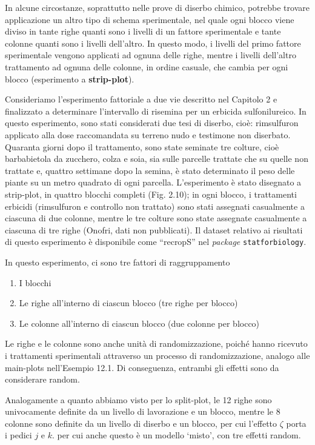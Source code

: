 \documentclass[
  12pt,
]{book}
\providecommand{\tightlist}{%
  \setlength{\itemsep}{0pt}\setlength{\parskip}{0pt}}
\begin{document}
In alcune circostanze, soprattutto nelle prove di diserbo chimico, potrebbe trovare applicazione un altro tipo di schema sperimentale, nel quale ogni blocco viene diviso in tante righe quanti sono i livelli di un fattore sperimentale e tante colonne quanti sono i livelli dell'altro. In questo modo, i livelli del primo fattore sperimentale vengono applicati ad ognuna delle righe, mentre i livelli dell'altro trattamento ad ognuna delle colonne, in ordine casuale, che cambia per ogni blocco (esperimento a \textbf{strip-plot}).

Consideriamo l'esperimento fattoriale a due vie descritto nel Capitolo 2 e finalizzato a determinare l'intervallo di risemina per un erbicida sulfonilureico. In questo esperimento, sono stati considerati due tesi di diserbo, cioè: rimsulfuron applicato alla dose raccomandata su terreno nudo e testimone non diserbato. Quaranta giorni dopo il trattamento, sono state seminate tre colture, cioè barbabietola da zucchero, colza e soia, sia sulle parcelle trattate che su quelle non trattate e, quattro settimane dopo la semina, è stato determinato il peso delle piante su un metro quadrato di ogni parcella. L'esperimento è stato disegnato a strip-plot, in quattro blocchi completi (Fig. 2.10); in ogni blocco, i trattamenti erbicidi (rimsulfuron e controllo non trattato) sono stati assegnati casualmente a ciascuna di due colonne, mentre le tre colture sono state assegnate casualmente a ciascuna di tre righe (Onofri, dati non pubblicati). Il dataset relativo ai risultati di questo esperimento è disponibile come ``recropS'' nel \emph{package} \texttt{statforbiology}.

In questo esperimento, ci sono tre fattori di raggruppamento

\begin{enumerate}
\def\labelenumi{\arabic{enumi}.}
\tightlist
\item
  I blocchi
\item
  Le righe all'interno di ciascun blocco (tre righe per blocco)
\item
  Le colonne all'interno di ciascun blocco (due colonne per blocco)
\end{enumerate}

Le righe e le colonne sono anche unità di randomizzazione, poiché hanno ricevuto i
trattamenti sperimentali attraverso un processo di randomizzazione, analogo alle main-plots nell'Esempio 12.1. Di conseguenza, entrambi gli effetti sono da considerare random.

Analogamente a quanto abbiamo visto per lo split-plot, le 12 righe sono univocamente definite da un livello di lavorazione e un blocco, mentre le 8 colonne sono definite da un livello di diserbo e un blocco, per cui l'effetto \(\zeta\) porta i pedici \(j\) e \(k\). per cui anche questo è un modello `misto', con tre effetti random.
\end{document}
